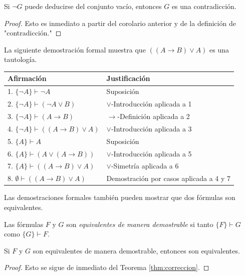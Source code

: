\documentclass[12pt,a4paper]{book}
\makeatletter
\newcommand{\comillas}[1]{"#1"}
\newenvironment{derivacion}{%
  \begingroup
  \renewcommand{\arraystretch}{1.35}
  \begin{center}
  \begin{tabular}{@{}l l@{}}
    \textbf{Afirmación} & \textbf{Justificación}\\
    \hline
}{%
  \end{tabular}
  \end{center}
  \endgroup
}
\makeatother
\begin{document}
    \begin{corolario}\label{cor:contradiccion-formal}
        Si $\neg G$ puede deducirse del conjunto vacío, entonces $G$ es una contradicción.
    \end{corolario}
    \begin{proof}
        Esto es inmediato a partir del corolario anterior y de la definición de \comillas{contradicción.}
    \end{proof}

    \begin{ejemplo}\label{ej:tautologia-implicacion}
        La siguiente demostración formal muestra que $((A\rightarrow B)\vee A)$ es una tautología.

        \begin{derivacion}
            1. $\{\neg A\}\vdash\neg A$ & Suposición\\
            2. $\{\neg A\}\vdash(\neg A\vee B)$ & $\vee$-Introducción aplicada a 1\\
            3. $\{\neg A\}\vdash(A\rightarrow B)$ & $\rightarrow$-Definición aplicada a 2\\
            4. $\{\neg A\}\vdash((A\rightarrow B)\vee A)$ & $\vee$-Introducción aplicada a 3\\
            5. $\{A\}\vdash A$ & Suposición\\
            6. $\{A\}\vdash(A\vee(A\rightarrow B))$ & $\vee$-Introducción aplicada a 5\\
            7. $\{A\}\vdash((A\rightarrow B)\vee A)$ & $\vee$-Simetría aplicada a 6\\
            8. $\emptyset\vdash((A\rightarrow B)\vee A)$ & Demostración por casos aplicada a 4 y 7\\
        \end{derivacion}
    \end{ejemplo}

    Las demostraciones formales también pueden mostrar que dos fórmulas son equivalentes.

    \begin{definicion}\label{def:equivalentes-demostrablemente}
        Las fórmulas $F$ y $G$ son \textit{equivalentes de manera demostrable} si tanto $\{F\}\vdash G$ como $\{G\}\vdash F$.
    \end{definicion}

    \begin{corolario}\label{cor:demostrable-implica-equivalente}
        Si $F$ y $G$ son equivalentes de manera demostrable, entonces son equivalentes.
    \end{corolario}
    \begin{proof}
        Esto se sigue de inmediato del Teorema \ref{thm:correccion}.
    \end{proof}
\end{document}
